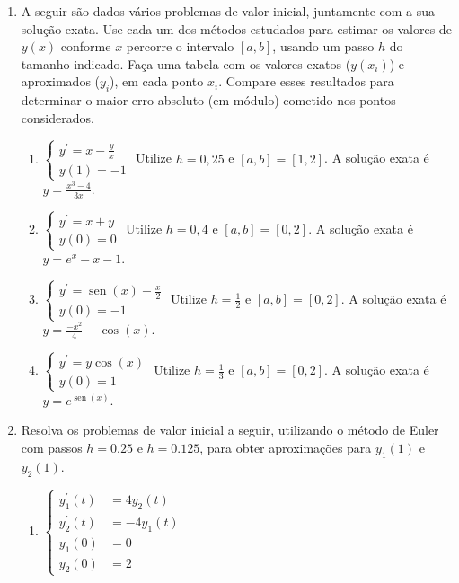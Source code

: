 \documentclass[12pt,a4paper]{article}
\newcommand*\sen{\operatorname{sen}}
\begin{document}
\begin{enumerate}
\item A seguir são dados vários problemas de valor inicial, juntamente com a sua solução exata. Use cada um dos métodos estudados para estimar os valores de $y(x)$ conforme $x$ percorre o intervalo $[a,b]$, usando um passo $h$ do tamanho indicado. Faça uma tabela com os valores exatos ($y(x_i)$) e aproximados ($y_i$), em cada ponto $x_i$. Compare esses resultados para determinar o maior erro absoluto (em módulo) cometido nos pontos considerados.
\begin{enumerate}
\item $\begin{cases}
y^\prime = x-\frac{y}{x} \\
y(1) = -1
\end{cases}$
Utilize $h = 0,25$ e $[a,b] = [1, 2]$. A solução exata é $y = \frac{x^3 - 4}{3x}$.
\item $\begin{cases}
y^\prime = x+y \\
y(0) = 0
\end{cases}$
Utilize $h = 0,4$ e $[a,b] = [0, 2]$. A solução exata é $y = e^x - x - 1$.
\item $\begin{cases}
y^\prime = \sen(x) - \frac{x}{2} \\
y(0) = -1
\end{cases}$
Utilize $h = \frac{1}{2}$ e $[a,b] = [0,2]$. A solução exata é $y = \frac{-x^2}{4} - \cos(x)$.
\item $\begin{cases}
y^\prime = y \cos(x) \\
y(0) = 1
\end{cases}$
Utilize $h = \frac{1}{3}$ e $[a,b] = [0,2]$. A solução exata é $y = e^{\sen(x)}$.
\end{enumerate}

\item Resolva os problemas de valor inicial a seguir, utilizando o método de Euler com passos $h = 0.25$ e $h=0.125$, para obter aproximações para $y_1(1)$ e $y_2(1)$.
\begin{multicols}{2}
\begin{enumerate}
\item $\begin{cases}
y_1^\prime(t) &= 4y_2(t)\\
y_2^\prime(t) &= -4y_1(t)\\
y_1(0) &= 0\\
y_2(0) &= 2
\end{cases}$


\end{enumerate}
\end{multicols}
\end{enumerate}
\end{document}
